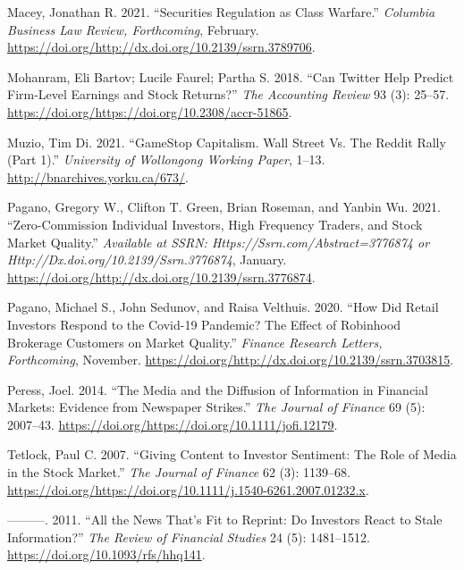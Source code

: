\documentclass[12pt,]{article}
\begin{document}
\leavevmode\hypertarget{ref-macey2021}{}%
Macey, Jonathan R. 2021. ``Securities Regulation as Class Warfare.''
\emph{Columbia Business Law Review, Forthcoming}, February.
\url{https://doi.org/http://dx.doi.org/10.2139/ssrn.3789706}.

\leavevmode\hypertarget{ref-bartov2018}{}%
Mohanram, Eli Bartov; Lucile Faurel; Partha S. 2018. ``Can Twitter Help
Predict Firm-Level Earnings and Stock Returns?'' \emph{The Accounting
Review} 93 (3): 25--57.
\url{https://doi.org/https://doi.org/10.2308/accr-51865}.

\leavevmode\hypertarget{ref-dimuzio2021}{}%
Muzio, Tim Di. 2021. ``GameStop Capitalism. Wall Street Vs. The Reddit
Rally (Part 1).'' \emph{University of Wollongong Working Paper}, 1--13.
\url{http://bnarchives.yorku.ca/673/}.

\leavevmode\hypertarget{ref-eaton2021}{}%
Pagano, Gregory W., Clifton T. Green, Brian Roseman, and Yanbin Wu.
2021. ``Zero-Commission Individual Investors, High Frequency Traders,
and Stock Market Quality.'' \emph{Available at SSRN:
Https://Ssrn.com/Abstract=3776874 or
Http://Dx.doi.org/10.2139/Ssrn.3776874}, January.
\url{https://doi.org/http://dx.doi.org/10.2139/ssrn.3776874}.

\leavevmode\hypertarget{ref-pagano2020}{}%
Pagano, Michael S., John Sedunov, and Raisa Velthuis. 2020. ``How Did
Retail Investors Respond to the Covid-19 Pandemic? The Effect of
Robinhood Brokerage Customers on Market Quality.'' \emph{Finance
Research Letters, Forthcoming}, November.
\href{https://doi.org/http://dx.doi.org/10.2139/ssrn.3703815\%20}{https://doi.org/http://dx.doi.org/10.2139/ssrn.3703815}.

\leavevmode\hypertarget{ref-peress2014}{}%
Peress, Joel. 2014. ``The Media and the Diffusion of Information in
Financial Markets: Evidence from Newspaper Strikes.'' \emph{The Journal
of Finance} 69 (5): 2007--43.
\url{https://doi.org/https://doi.org/10.1111/jofi.12179}.

\leavevmode\hypertarget{ref-tetlock2007}{}%
Tetlock, Paul C. 2007. ``Giving Content to Investor Sentiment: The Role
of Media in the Stock Market.'' \emph{The Journal of Finance} 62 (3):
1139--68.
\url{https://doi.org/https://doi.org/10.1111/j.1540-6261.2007.01232.x}.

\leavevmode\hypertarget{ref-tetlock2011}{}%
---------. 2011. ``All the News That's Fit to Reprint: Do Investors
React to Stale Information?'' \emph{The Review of Financial Studies} 24
(5): 1481--1512. \url{https://doi.org/10.1093/rfs/hhq141}.
\end{document}

